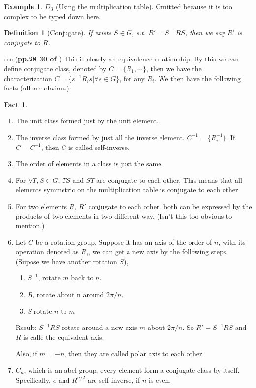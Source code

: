 \documentclass{article}
\numberwithin{equation}{subsection} %
\newtheorem{defi}{Definition}[section]
\theoremstyle{definition}
\newtheorem{ex}{Example}[section]
\newtheorem{fact}{Fact}[section]
\begin{document}
\begin{ex}
    $D_3$ (Using the multiplication table). Omitted because it is too
    complex to be typed down here.
\end{ex}

\begin{defi}[Conjugate]
    If exists $S\in G$, s.t. $R' = S^{-1}RS$, then we say $R'$ is
    conjugate to $R$.
\end{defi}
see (\textbf{pp.28-30 of \cite{book}})
This is clearly an equivalence relationship. By this we can define
conjugate class, denoted by $C=\{R_1,\cdots\}$, then we have the
characterization $C = \{ s^{-1} R_i s|\forall s\in G\}$, for any
$R_i$. We then have the following facts (all are obvious):
\begin{fact}$ $

    \begin{enumerate}
        \item The unit class formed just by the unit element.
        \item The inverse class formed by just all the inverse element.
            $C^{-1} = \{ R_i^{-1}\}$. If $C=C^{-1}$, then $C$ is called
            self-inverse.
        \item The order of elements in a class is just the same.
        \item For $\forall T,S\in G$, $TS$ and $ST$ are conjugate to each
            other. This means that all elements symmetric on the
            multiplication table is conjugate to each other.
        \item For two elements $R$, $R'$ conjugate to each other, both
            can be expressed by the products of two elements in two
            different way. (Isn't this too obvious to mention.)
        \item Let $G$ be a rotation group. Suppose it has an axis of the
            order of $n$, with its operation denoted as $R$,, we can get
            a new axis by the following steps. (Supose we have another
            rotation $S$),

            \begin{enumerate}
                \item  $S^{-1}$, rotate $m$ back to $n$.
                \item  $R$, rotate about n around $2\pi/n$,
                \item  $S$ rotate $n$ to $m$
            \end{enumerate}

            Result: $S^{-1}RS$ rotate around a new axis $m$ about
            $2\pi/n$. So $R'=S^{-1}RS$ and $R$ is calle the equivalent
            axis. 
            
            Also, if $m=-n$, then they are called polar axis to each
            other.

        \item $C_n$, which is an abel group, every element form a
            conjugate class by itself. Specifically, $e$ and $R^{n/2}$
            are self inverse, if $n$ is even.
    \end{enumerate}
\end{fact}
\end{document}
